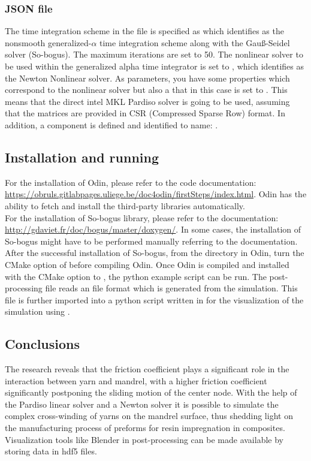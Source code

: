 \subsubsection{JSON file}
The time integration scheme in the  file is specified as  which identifies as the nonsmooth generalized-$\alpha$ time integration scheme along with the Gau{\ss}-Seidel solver (So-bogus). The maximum iterations are set to 50. The nonlinear solver to be used within the generalized alpha time integrator is set to , which identifies as the Newton Nonlinear solver. As parameters, you have some properties which correspond to the nonlinear solver but also a  that in this case is set to . This means that the direct intel MKL Pardiso solver is going to be used, assuming that the matrices are provided in CSR (Compressed Sparse Row) format. In addition, a component  is defined and identified to name: .

\subsection{Installation and running}
For the installation of Odin, please refer to the code documentation: \url{https://obruls.gitlabpages.uliege.be/doc4odin/firstSteps/index.html}. Odin has the ability to fetch and install the third-party libraries automatically.\\

For the installation of So-bogus library, please refer to the documentation: \url{http://gdaviet.fr/doc/bogus/master/doxygen/}. In some cases, the installation of So-bogus might have to be performed manually referring to the documentation. After the successful installation of So-bogus, from the  directory in Odin, turn  the CMake option of  before compiling Odin. Once Odin is compiled and installed with the CMake option  to , the python example script can be run. The post-processing file reads an  file format which is generated from the simulation. This  file is further imported into a python script written in  for the visualization of the simulation using .

\subsection{Conclusions}
The research reveals that the friction coefficient plays a significant role in the interaction between yarn and mandrel, with a higher friction coefficient significantly postponing the sliding motion of the center node. 
With the help of the Pardiso linear solver and a Newton solver it is possible to simulate the complex cross-winding of yarns on the mandrel surface, thus shedding light on the manufacturing process of preforms for resin impregnation in composites. 
Visualization tools like Blender in post-processing can be made available by storing data in hdf5 files.





